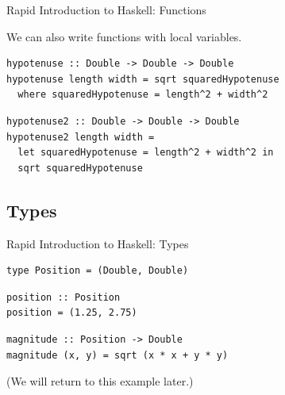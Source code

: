 \documentclass[8pt,aspectratio=169]{beamer}
\begin{document}

\begin{frame}[fragile]{Rapid Introduction to Haskell: Functions}

We can also write functions with local variables.

\pause
\begin{verbatim}
hypotenuse :: Double -> Double -> Double
hypotenuse length width = sqrt squaredHypotenuse
  where squaredHypotenuse = length^2 + width^2
\end{verbatim}

\pause
\begin{verbatim}
hypotenuse2 :: Double -> Double -> Double
hypotenuse2 length width =
  let squaredHypotenuse = length^2 + width^2 in
  sqrt squaredHypotenuse
\end{verbatim}

\end{frame}


\subsection{Types}


\begin{frame}[fragile]{Rapid Introduction to Haskell: Types}

\pause
\begin{verbatim}
type Position = (Double, Double)
\end{verbatim}

\pause
\begin{verbatim}
position :: Position
position = (1.25, 2.75)
\end{verbatim}

\pause
\begin{verbatim}
magnitude :: Position -> Double
magnitude (x, y) = sqrt (x * x + y * y)
\end{verbatim}

\vspace{5mm}

\pause
(We will return to this example later.)

\end{frame}
\end{document}
